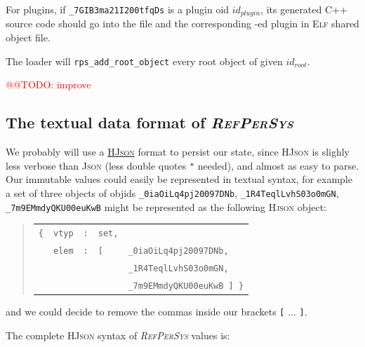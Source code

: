 \documentclass[11pt,a4paper,svgnames]{article}
\newcommand{\RefPerSys}{{\textit{\textsc{RefPerSys}}}}
\begin{document}
For plugins, if \texttt{\_7GIB3ma21I200tfqDs} is a plugin oid $id_{plugin}$, its
generated C++ source code should go into the file
{} and
the corresponding
\href{http://man7.org/linux/man-pages/man3/dlopen.3.html}{{}}-ed
plugin in
{}
\textsc{Elf} shared object file.

The loader will \texttt{rps\_add\_root\_object} every root object of given $id_{root}$.


\textcolor{red}{@@TODO: improve}

\subsection{The textual data format of \RefPerSys}
\label{subsec:data-format}

We probably will use a \href{http://hjson.org}{\textsc{HJson}} format
to persist our state, since \textsc{HJson} is slighly less verbose
than \textsc{Json} (less double quotes \texttt{"} needed), and almost
as easy to parse. Our immutable values could easily be represented in
textual syntax, for example a set of three objects of objids
\texttt{\_0iaOiLq4pj20097DNb}, \texttt{\_1R4TeqlLvhS03o0mGN},
\texttt{\_7m9EMmdyQKU00euKwB} might be represented as the following
\textsc{Hjson} object:
\begin{quote}
\begin{relsize}{-1}
  \begin{tabular}{lllll}
    \texttt{\{} & \texttt{vtyp} & \texttt{:} & \texttt{set,} & ~  \\
    ~           & \texttt{elem} & \texttt{:} & \texttt{[} & \texttt{\_0iaOiLq4pj20097DNb,}  \\
    ~           & ~             & ~          & ~           & \texttt{\_1R4TeqlLvhS03o0mGN,} \\
    ~           & ~             & ~          & ~           & \texttt{\_7m9EMmdyQKU00euKwB ] \}} \\
  \end{tabular}
\end{relsize}
\end{quote}
and we could decide to remove the commas inside our brackets \texttt{[} {} ... \texttt{]}.
\medskip

The  complete \textsc{HJson} syntax of {\RefPerSys} values is:
\end{document}

